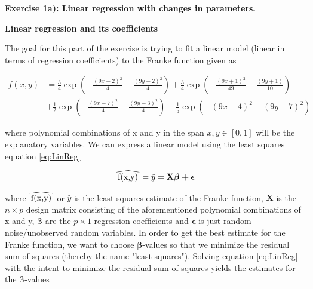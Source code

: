 \documentclass[12pt,a4paper]{article}
\newcommand\reallywidehat[1]{%
\savestack{\tmpbox}{\stretchto{%
  \scaleto{%
    \scalerel*[\widthof{\ensuremath{#1}}]{\kern-.6pt\bigwedge\kern-.6pt}%
    {\rule[-\textheight/2]{1ex}{\textheight}}%
  }{\textheight}%
}{0.5ex}}%
\stackon[1pt]{#1}{\tmpbox}%
}
\begin{document}
\newpage

\begin{center}
\Large{\textbf{Exercise 1a): Linear regression with changes in parameters.}}
\end{center}

\begin{center}
\large{\textbf{Linear regression and its coefficients}}
\end{center}

\noindent The goal for this part of the exercise is trying to fit a linear model (linear in terms of regression coefficients) to the Franke function given as

\begin{equation}\label{eq:Franke}
\begin{aligned}
f(x,y) &= \frac{3}{4}\exp{\left(-\frac{(9x-2)^2}{4} - \frac{(9y-2)^2}{4}\right)}+\frac{3}{4}\exp{\left(-\frac{(9x+1)^2}{49}- \frac{(9y+1)}{10}\right)} \\
&+\frac{1}{2}\exp{\left(-\frac{(9x-7)^2}{4} - \frac{(9y-3)^2}{4}\right)} -\frac{1}{5}\exp{\left(-(9x-4)^2 - (9y-7)^2\right) }
\end{aligned}
\end{equation}

\noindent where polynomial combinations of x and y in the span $x,y \in [0,1]$ will be the explanatory variables. We can express a linear model using the least squares equation \ref{eq:LinReg}

\begin{equation}\label{eq:LinReg}
\begin{aligned}
\reallywidehat{f(x,y)} = \hat{y} = \textbf{X} \boldsymbol{\beta + \epsilon}
\end{aligned}
\end{equation}

\noindent where $\reallywidehat{f(x,y)}$ or $\hat{y}$ is the least squares estimate of the Franke function, $\textbf{X}$ is the $n\times p$ design matrix consisting of the aforementioned polynomial combinations of x and y, $\boldsymbol{\beta}$ are the $p\times 1$ regression coefficients and $\boldsymbol{\epsilon}$ is just random noise/unobserved random variables. In order to get the best estimate for the Franke function, we want to choose $\boldsymbol{\beta}$-values so that we minimize the residual sum of squares (thereby the name "least squares"). Solving equation \ref{eq:LinReg} with the intent to minimize the residual sum of squares yields the estimates for the $\boldsymbol{\beta}$-values 
\end{document}
